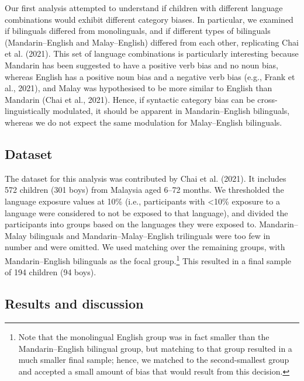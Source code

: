 \documentclass[10pt, letterpaper]{article}
\begin{document}
Our first analysis attempted to understand if children with different
language combinations would exhibit different category biases. In
particular, we examined if bilinguals differed from monolinguals, and if
different types of bilinguals (Mandarin--English and Malay--English)
differed from each other, replicating Chai et al. (2021). This set of
language combinations is particularly interesting because Mandarin has
been suggested to have a positive verb bias and no noun bias, whereas
English has a positive noun bias and a negative verb bias (e.g., Frank
et al., 2021), and Malay was hypothesised to be more similar to English
than Mandarin (Chai et al., 2021). Hence, if syntactic category bias can
be cross-linguistically modulated, it should be apparent in
Mandarin--English bilinguals, whereas we do not expect the same
modulation for Malay--English bilinguals.

\subsection{Dataset}\label{dataset}

The dataset for this analysis was contributed by Chai et al. (2021). It
includes 572 children (301 boys) from Malaysia aged 6--72 months. We
thresholded the language exposure values at 10\% (i.e., participants
with \textless10\% exposure to a language were considered to not be
exposed to that language), and divided the participants into groups
based on the languages they were exposed to. Mandarin--Malay bilinguals
and Mandarin--Malay--English trilinguals were too few in number and were
omitted. We used matching over the remaining groups, with
Mandarin--English bilinguals as the focal group.\footnote{Note that the
  monolingual English group was in fact smaller than the
  Mandarin--English bilingual group, but matching to that group resulted
  in a much smaller final sample; hence, we matched to the
  second-smallest group and accepted a small amount of bias that would
  result from this decision.} This resulted in a final sample of 194
children (94 boys).

\subsection{Results and discussion}\label{results-and-discussion}
\end{document}
